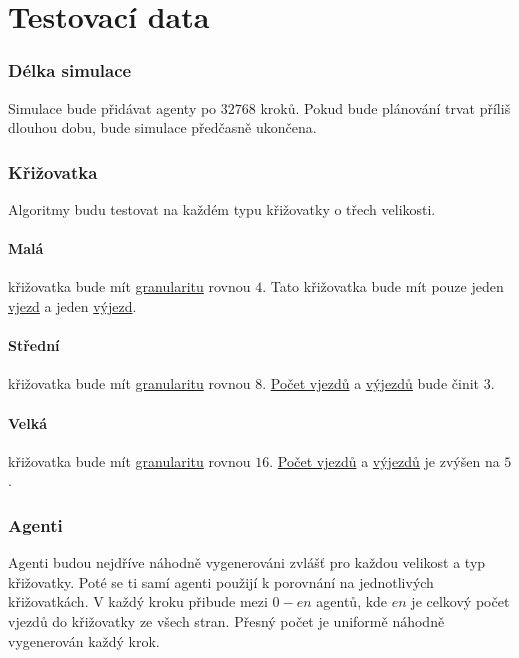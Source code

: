 \section{Testovací data}\label{sec:testovaci_data}


\subsubsection{Délka simulace}

Simulace bude přidávat agenty po $32768$ kroků.
Pokud bude plánování trvat příliš dlouhou dobu, bude simulace předčasně ukončena.

\subsubsection{Křižovatka}

Algoritmy budu testovat na každém typu křižovatky o třech velikosti.
\paragraph{Malá}\label{par:data_mala} křižovatka bude mít \hyperref[par:granularita]{granularitu} rovnou $4$.
Tato křižovatka bude mít pouze jeden \hyperref[par:vjezdy]{vjezd} a jeden \hyperref[par:vyjezdy]{výjezd}.
\paragraph{Střední}\label{par:data_stredni} křižovatka bude mít \hyperref[par:granularita]{granularitu} rovnou $8$.
\hyperref[par:vjezdy]{Počet vjezdů} a \hyperref[par:vyjezdy]{výjezdů} bude činit $3$.
\paragraph{Velká}\label{par:data_velka} křižovatka bude mít \hyperref[par:granularita]{granularitu} rovnou $16$.
\hyperref[par:vjezdy]{Počet vjezdů} a \hyperref[par:vyjezdy]{výjezdů} je zvýšen na $5$.

\subsubsection{Agenti}

Agenti budou nejdříve náhodně vygenerováni zvlášť pro každou velikost a typ křižovatky.
Poté se ti samí agenti použijí k porovnání na jednotlivých křižovatkách.
V každý kroku přibude mezi $0 - en$ agentů, kde $en$ je celkový počet vjezdů do křižovatky ze všech stran.
Přesný počet je uniformě náhodně vygenerován každý krok.

